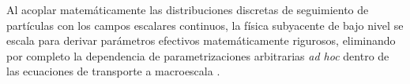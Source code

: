 Al acoplar matemáticamente las distribuciones discretas de seguimiento de partículas con los campos escalares continuos, la física subyacente de bajo nivel se escala para derivar parámetros efectivos matemáticamente rigurosos, eliminando por completo la dependencia de parametrizaciones arbitrarias \emph{ad hoc} dentro de las ecuaciones de transporte a macroescala \cite{brenner1993macrotransport, brenner1980dispersion, rinaldi2002body}.
